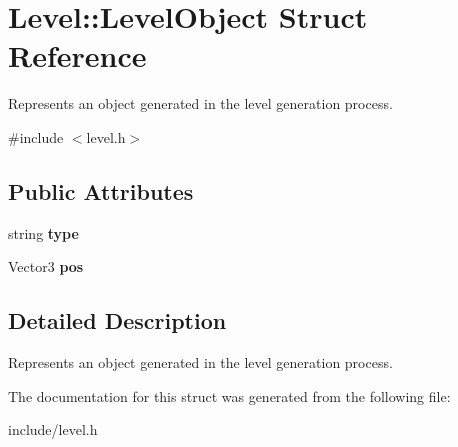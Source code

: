 \hypertarget{structLevel_1_1LevelObject}{
\section{\-Level\-:\-:\-Level\-Object \-Struct \-Reference}
\label{db/d41/structLevel_1_1LevelObject}
}


\-Represents an object generated in the level generation process.  




{\ttfamily \#include $<$level.\-h$>$}

\subsection*{\-Public \-Attributes}
\begin{DoxyCompactItemize}
\item 
\hypertarget{structLevel_1_1LevelObject_a6ffa0d504f8abd6ea1724085144d62ac}{
string {\bfseries type}}
\label{db/d41/structLevel_1_1LevelObject_a6ffa0d504f8abd6ea1724085144d62ac}

\item 
\hypertarget{structLevel_1_1LevelObject_a25e623cce9b0c2997936d92d74ffd7b1}{
\-Vector3 {\bfseries pos}}
\label{db/d41/structLevel_1_1LevelObject_a25e623cce9b0c2997936d92d74ffd7b1}

\end{DoxyCompactItemize}


\subsection{\-Detailed \-Description}
\-Represents an object generated in the level generation process. 

\-The documentation for this struct was generated from the following file\-:\begin{DoxyCompactItemize}
\item 
include/level.\-h\end{DoxyCompactItemize}
